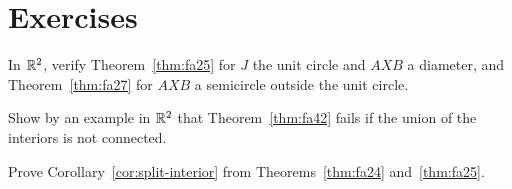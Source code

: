 \section*{Exercises}

\begin{exercise}
In $\mathbb{R}^2$, verify Theorem~\ref{thm:fa25} for $J$ the unit circle and $AXB$ a diameter, and Theorem~\ref{thm:fa27} for $AXB$ a semicircle
outside the unit circle.
\end{exercise}

\begin{exercise}
Show by an example in $\mathbb{R}^2$ that Theorem~\ref{thm:fa42} fails if the union of the interiors is not connected.
\end{exercise}

\begin{exercise}
Prove Corollary~\ref{cor:split-interior} from Theorems~\ref{thm:fa24} and~\ref{thm:fa25}.
\end{exercise}
